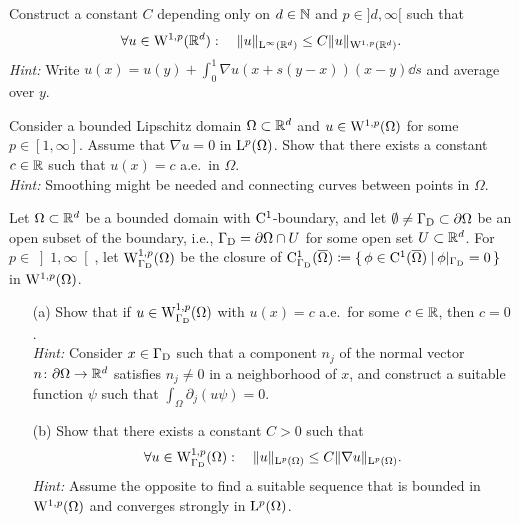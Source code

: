 \documentclass[12pt,a4paper]{article}
\begin{document}

\setcounter{AUFGABE}{21}

 Construct a constant $C$ depending only on $d\in{\mathbb N}$ and $p \in ]d,\infty[$ such that
\[
\forall u \in {\mathrm W}^{1,p}({\mathbb R}^d) :\quad \|u\|_{{\mathrm L}^\infty({\mathbb R}^d)} \leq C\|u\|_{{\mathrm W}^{1,p}({\mathbb R}^d)}.
\]
\emph{Hint:} Write $u(x) = u(y) + \int_0^1 \nabla u(x + s(y{-}x))(x{-}y) \dd s$ and average over $y$. 

 Consider a bounded Lipschitz domain $\Omega \subset {\mathbb R}^d$ and $u \in {\mathrm W}^{1,p}(\Omega)$ for some $p \in [1, \infty]$. Assume that $\nabla u = 0$ in ${\mathrm L}^p(\Omega)$. Show that there exists a constant $c \in {\mathbb R}$ such that $u(x) = c$ a.e.\ in $\Omega$.
\\
\textit{Hint:} Smoothing might be needed and connecting curves between points in $\Omega$.


Let $\Omega\subset{\mathbb R}^d$ 
be a bounded domain with ${\mathrm C}^1$-boundary,
and let $\emptyset\neq\Gamma_{\mathrm D}\subset\partial\Omega$
be an open subset of the boundary, i.e., 
$\Gamma_{\mathrm D}=\partial\Omega\cap U$ for some open set $U\subset{\mathbb R}^d$.
For $p\in\left]1,\infty\right[$,
let ${\mathrm W}^{1,p}_{\Gamma_{\mathrm D}}(\Omega)$ 
be the closure of 
${\mathrm C}^1_{\Gamma_{\mathrm D}}(\overline{\Omega})\coloneqq\{\, \phi\in{\mathrm C}^1(\overline{\Omega}) \: | \: \phi|_{\Gamma_{\mathrm D}}=0 \,\}$
in ${\mathrm W}^{1,p}(\Omega)$.
\begin{enumerate}
\item[(a)]
Show that if $u\in{\mathrm W}^{1,p}_{\Gamma_{\mathrm D}}(\Omega)$ with $u(x)=c$ a.e.~for some $c\in{\mathbb R}$,
then $c=0$.
\\
\textit{Hint:}
Consider $x\in\Gamma_{\mathrm D}$ such that a component $n_j$ of the 
normal vector $n\colon\partial\Omega\to{\mathbb R}^d$ satisfies
$n_j\neq 0$ in a neighborhood of $x$, 
and construct a suitable function $\psi$
such that $\int_\Omega \partial_j(u\psi)=0$. 
\item[(b)]
Show that there exists a constant $C>0$
such that
\[
\forall u\in{\mathrm W}^{1,p}_{\Gamma_{\mathrm D}}(\Omega):
\quad
\lVert u \rVert_{{\mathrm L}^p(\Omega)}
\leq C\lVert \nabla u \rVert_{{\mathrm L}^p(\Omega)}.
\]
\textit{Hint:}
Assume the opposite to 
find a suitable sequence
that is bounded in ${\mathrm W}^{1,p}(\Omega)$
and converges strongly in ${\mathrm L}^{p}(\Omega)$.
\end{enumerate}
\end{document}
